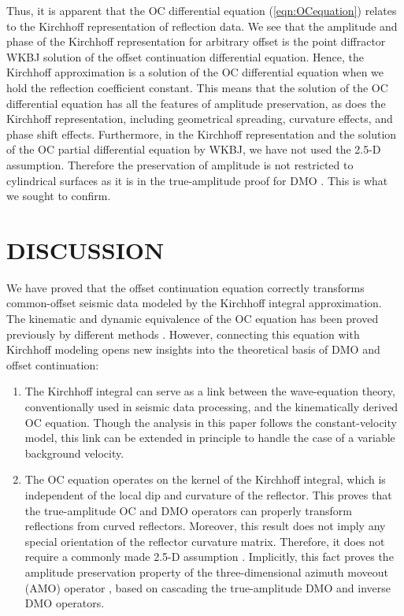 \par
Thus, it is apparent that the OC differential equation
(\ref{eqn:OCequation}) relates to the Kirchhoff representation of
reflection data. We see that the amplitude and phase of the Kirchhoff
representation for arbitrary offset is the point diffractor WKBJ
solution of the offset continuation differential equation.  Hence, the
Kirchhoff approximation is a solution of the OC differential equation
when we hold the reflection coefficient constant.  This means that the
solution of the OC differential equation has all the features of
amplitude preservation, as does the Kirchhoff representation,
including geometrical spreading, curvature effects, and phase shift
effects.  Furthermore, in the Kirchhoff representation and the
solution of the OC partial differential equation by WKBJ, we have not
used the 2.5-D assumption.  Therefore the preservation of amplitude is
not restricted to cylindrical surfaces as it is in the true-amplitude
proof for DMO \cite[]{cwp}.  This is what we sought to confirm.



\section{DISCUSSION}

We have proved that the offset continuation equation correctly
transforms common-offset seismic data modeled by the Kirchhoff
integral approximation. The kinematic and dynamic equivalence of the
OC equation has been proved previously by different methods
\cite[]{GEO68-02-07180732}. However, connecting this equation with
Kirchhoff modeling opens new insights into the theoretical basis of
DMO and offset continuation: 
\begin{enumerate} 

\item 
The Kirchhoff integral can serve as a link between the wave-equation
theory, conventionally used in seismic data processing, and the
kinematically derived OC equation. Though the analysis in this paper
follows the constant-velocity model, this link can be extended in
principle to handle the case of a variable background velocity.

\item 
The OC equation operates on the kernel of the Kirchhoff integral,
which is independent of the local dip and curvature of the
reflector. This proves that the true-amplitude OC and DMO operators
can properly transform reflections from curved reflectors.
Moreover, this result does not imply any special
orientation of the reflector curvature matrix. Therefore, it does
not require a commonly made 2.5-D assumption
\cite[]{cwp}. Implicitly, this fact proves the amplitude
preservation property of the three-dimensional azimuth moveout (AMO)
operator \cite[]{GEO63-02-05740588}, based on cascading the true-amplitude DMO
and inverse DMO operators.
\end{enumerate}

